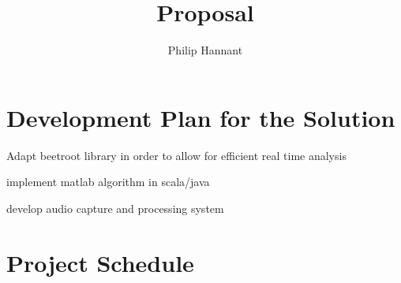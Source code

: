 \documentclass{article} \title{Proposal} \author{Philip Hannant}
\begin{document}
\maketitle{} 
\section{Development Plan for the Solution}

Adapt beetroot library in order to allow for efficient real time analysis

implement matlab algorithm in scala/java

develop audio capture and processing system 

\maketitle{} 
\section{Project Schedule}
\end{document}
